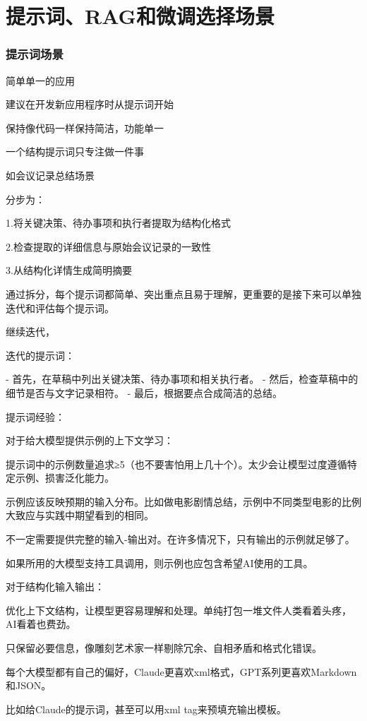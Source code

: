 \documentclass[12pt]{book}
\begin{document}
\chapter{提示词、RAG和微调选择场景}
\subsection{提示词场景}
简单单一的应用

建议在开发新应用程序时从提示词开始



保持像代码一样保持简洁，功能单一


一个结构提示词只专注做一件事


如会议记录总结场景

分步为：

1.将关键决策、待办事项和执行者提取为结构化格式

2.检查提取的详细信息与原始会议记录的一致性

3.从结构化详情生成简明摘要


通过拆分，每个提示词都简单、突出重点且易于理解，更重要的是接下来可以单独迭代和评估每个提示词。


继续迭代，

迭代的提示词：

- 首先，在草稿中列出关键决策、待办事项和相关执行者。
- 然后，检查草稿中的细节是否与文字记录相符。
- 最后，根据要点合成简洁的总结。

提示词经验：

对于给大模型提供示例的上下文学习：

提示词中的示例数量追求≥5（也不要害怕用上几十个）。太少会让模型过度遵循特定示例、损害泛化能力。

示例应该反映预期的输入分布。比如做电影剧情总结，示例中不同类型电影的比例大致应与实践中期望看到的相同。

不一定需要提供完整的输入-输出对。在许多情况下，只有输出的示例就足够了。

如果所用的大模型支持工具调用，则示例也应包含希望AI使用的工具。

对于结构化输入输出：

优化上下文结构，让模型更容易理解和处理。单纯打包一堆文件人类看着头疼，AI看着也费劲。

只保留必要信息，像雕刻艺术家一样剔除冗余、自相矛盾和格式化错误。

每个大模型都有自己的偏好，Claude更喜欢xml格式，GPT系列更喜欢Markdown和JSON。

比如给Claude的提示词，甚至可以用xml tag来预填充输出模板。
\end{document}
